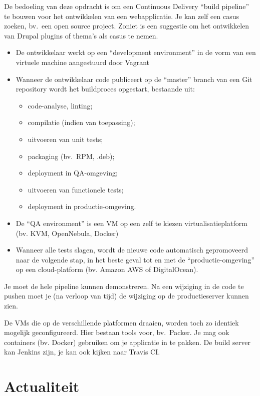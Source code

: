 De bedoeling van deze opdracht is om een Continuous Delivery ``build pipeline'' te bouwen voor het ontwikkelen van een webapplicatie. Je kan zelf een casus zoeken, bv.~een open source project. Zoniet is een suggestie om het ontwikkelen van Drupal plugins of thema's als casus te nemen.

\begin{itemize}
\item De ontwikkelaar werkt op een ``development environment'' in de vorm van een virtuele machine aangestuurd door Vagrant
\item Wanneer de ontwikkelaar code publiceert op de ``master'' branch van een Git repository wordt het buildproces opgestart, bestaande uit:

  \begin{itemize}
  \item code-analyse, linting;
  \item compilatie (indien van toepassing);
  \item uitvoeren van unit tests;
  \item packaging (bv.~RPM, .deb);
  \item deployment in QA-omgeving;
  \item uitvoeren van functionele tests;
  \item deployment in productie-omgeving.
  \end{itemize}

\item De ``QA environment'' is een VM op een zelf te kiezen virtualisatieplatform (bv. KVM, OpenNebula, Docker)
\item Wanneer alle tests slagen, wordt de nieuwe code automatisch gepromoveerd naar de volgende stap, in het beste geval tot en met de ``productie-omgeving'' op een cloud-platform (bv. Amazon AWS of DigitalOcean).
\end{itemize}

Je moet de hele pipeline kunnen demonstreren. Na een wijziging in de code te pushen moet je (na verloop van tijd) de wijziging op de productieserver kunnen zien.

De VMs die op de verschillende platformen draaien, worden toch zo identiek mogelijk geconfigureerd. Hier bestaan tools voor, bv.~Packer.  Je mag ook containers (bv. Docker) gebruiken om je applicatie in te pakken. De build server kan Jenkins zijn, je kan ook kijken naar Travis CI.

\section{Actualiteit}
\label{sec:actualiteit}

